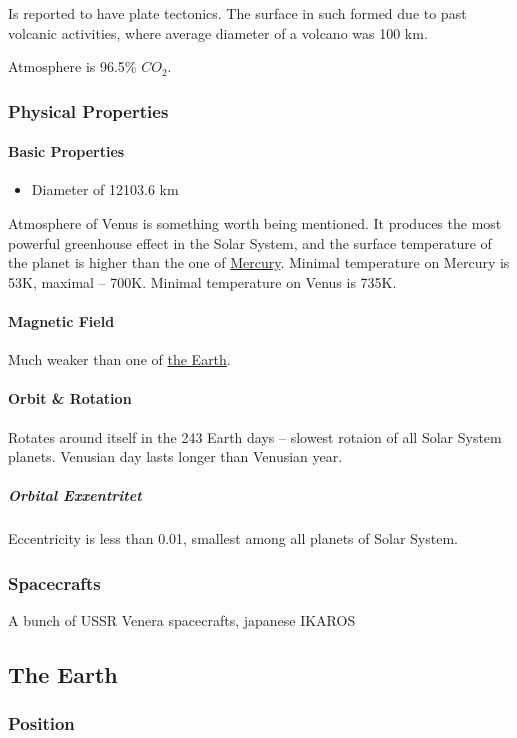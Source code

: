 Is reported to have plate tectonics. The surface in such formed due to past
volcanic activities, where average diameter of a volcano was 100 km.

Atmosphere is 96.5\% $CO_2$.

\subsubsection{Physical Properties}
\paragraph{Basic Properties}
\begin{itemize}
	\item Diameter of 12103.6 km
\end{itemize}

Atmosphere of Venus is something worth being mentioned. It produces the most
powerful greenhouse effect in the Solar System, and the surface
temperature of the planet is higher than the one of
\hyperref[planet:mercury]{Mercury}. Minimal temperature on Mercury is 53K,
maximal -- 700K. Minimal temperature on Venus is 735K.

\paragraph{Magnetic Field}
Much weaker than one of \hyperref[planet:earth]{the Earth}.
\paragraph{Orbit \& Rotation}
Rotates around itself in the 243 Earth days -- slowest rotaion of all Solar
System planets. Venusian day lasts longer than Venusian year.

\subparagraph{Orbital Exxentritet}
Eccentricity is less than 0.01, smallest among all planets of Solar System.
\subsubsection{Spacecrafts}
A bunch of USSR Venera spacecrafts, japanese IKAROS

\subsection{The Earth}
\label{planet:earth}
\subsubsection{Position}
